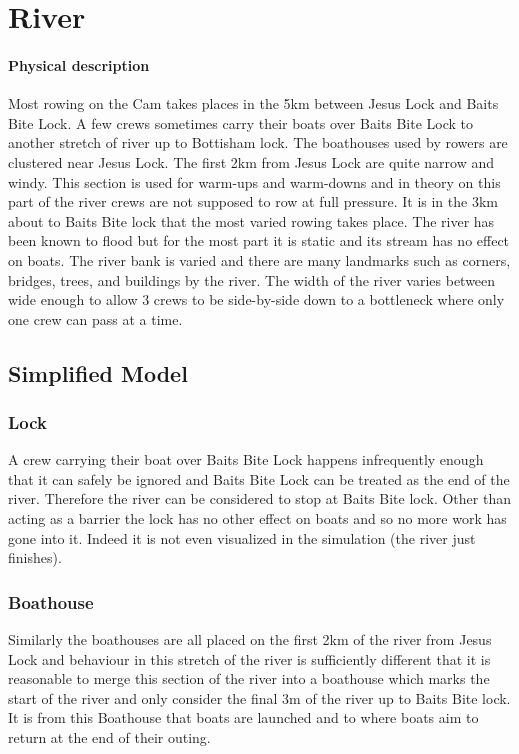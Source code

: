     \section{River}
      \paragraph{Physical description}
      Most rowing on the Cam takes places in the 5km between Jesus Lock and Baits Bite Lock. A few crews sometimes carry their boats over Baits Bite Lock to another stretch of river up to Bottisham lock. The boathouses used by rowers are clustered near Jesus Lock. The first 2km from Jesus Lock are quite narrow and windy. This section is used for warm-ups and warm-downs and in theory on this part of the river crews are not supposed to row at full pressure. It is in the 3km about to Baits Bite lock that the most varied rowing takes place. The river has been known to flood but for the most part it is static and its stream has no effect on boats. The river bank is varied and there are many landmarks such as corners, bridges, trees, and buildings by the river. The width of the river varies between wide enough to allow 3 crews to be side-by-side down to a bottleneck where only one crew can pass at a time.
      
      \subsection{Simplified Model}
      
      \subsubsection{Lock}
      A crew carrying their boat over Baits Bite Lock happens infrequently enough that it can safely be ignored and Baits Bite Lock can be treated as the end of the river. Therefore the river can be considered to stop at Baits Bite lock. Other than acting as a barrier the lock has no other effect on boats and so no more work has gone into it. Indeed it is not even visualized in the simulation (the river just finishes).
      
      \subsubsection{Boathouse}
      Similarly the boathouses are all placed on the first 2km of the river from Jesus Lock and behaviour in this stretch of the river is sufficiently different that it is reasonable to merge this section of the river into a boathouse which marks the start of the river and only consider the final 3m of the river up to Baits Bite lock. It is from this Boathouse that boats are launched and to where boats aim to return at the end of their outing.
      
